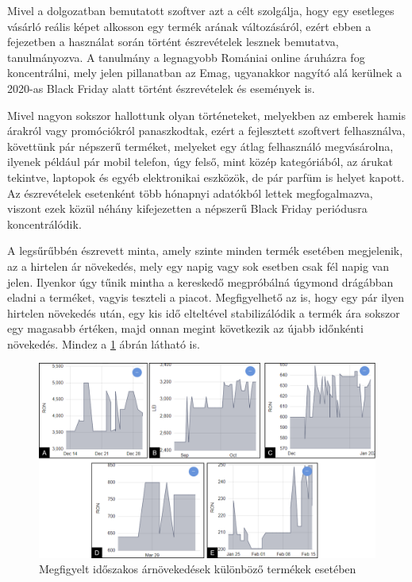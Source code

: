 Mivel a dolgozatban bemutatott szoftver azt a célt szolgálja, hogy egy esetleges vásárló reális képet alkosson egy termék arának változásáról, ezért ebben a fejezetben a használat során történt észrevételek lesznek bemutatva, tanulmányozva. A tanulmány a legnagyobb Romániai online áruházra fog koncentrálni, mely jelen pillanatban az Emag, ugyanakkor nagyító alá kerülnek a 2020-as Black Friday alatt történt észrevételek és események is. 

Mivel nagyon sokszor hallottunk olyan történeteket, melyekben az emberek hamis árakról vagy promóciókról panaszkodtak, ezért a fejlesztett szoftvert felhasználva, követtünk pár népszerű terméket, melyeket egy átlag felhasználó megvásárolna, ilyenek például pár mobil telefon, úgy felső, mint közép kategóriából, az árukat tekintve, laptopok és egyéb elektronikai eszközök, de pár parfüm is helyet kapott. Az észrevételek esetenként több hónapnyi adatókból lettek megfogalmazva, viszont ezek közül néhány kifejezetten a népszerű Black Friday periódusra koncentrálódik. 

A legsűrűbbén észrevett minta, amely szinte minden termék esetében megjelenik, az a hirtelen ár növekedés, mely egy napig vagy sok esetben csak fél napig van jelen. Ilyenkor úgy tűnik mintha a kereskedő megpróbálná úgymond drágábban eladni a terméket, vagyis teszteli a piacot. Megfigyelhető az is, hogy egy pár ilyen hirtelen növekedés után, egy kis idő elteltével stabilizálódik a termék ára sokszor egy magasabb értéken, majd onnan megint következik az újabb időnkénti növekedés. Mindez a \ref{fig:spikes} ábrán látható is.

\begin{figure}[H]
    \centering
    \includegraphics[scale=1]{figures/images/study/spikes.png}
    \caption{Megfigyelt időszakos árnövekedések különböző termékek esetében}
    \label{fig:spikes}
\end{figure}

